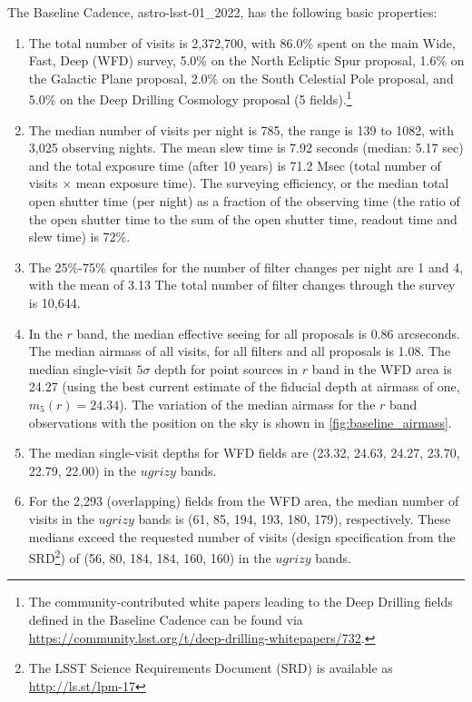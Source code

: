 \documentclass[DM,lsstdraft,authoryear,toc]{lsstdoc}
\begin{document}
The Baseline Cadence, astro-lsst-01\_2022, has the following basic properties:
\begin{enumerate}
\item The total number of visits is 2,372,700, with 86.0\% spent on
the main Wide, Fast, Deep (WFD) survey, 5.0\% on the
North Ecliptic Spur proposal, 1.6\% on the Galactic Plane proposal, 2.0\%
on the South Celestial Pole proposal, and 5.0\% on the Deep Drilling
Cosmology proposal (5 fields).\footnote{The community-contributed white papers leading to the
Deep Drilling fields defined in the Baseline Cadence can be found via
\url{https://community.lsst.org/t/deep-drilling-whitepapers/732}.}

\item The median number of visits per night is 785, the range is
139 to 1082, with 3,025 observing nights. The mean slew time is 7.92
seconds (median: 5.17 sec) and the total exposure time (after 10 years) is 71.2 Msec (total number of visits $\times$ mean exposure time).
The surveying efficiency, or the median total open shutter time (per night)
as a fraction of the observing time (the ratio of the open shutter time to
the sum of the open shutter time, readout time and slew time) is 72\%.

\item
The 25\%-75\% quartiles for the number of filter changes per night are 1
and 4, with the mean of 3.13 The total number of filter changes through the survey is 10,644.

\item In the $r$ band, the median effective seeing for all proposals is 0.86 arcseconds.
The median airmass of all visits, for all filters and all proposals is 1.08.
The median single-visit $5\sigma$ depth for point sources in $r$ band in the WFD area is 24.27 (using the best
current estimate of the fiducial depth at airmass of one, $m_5(r)=24.34$).
The variation of the median airmass for the $r$
band observations with the position on the sky is shown in
\autoref{fig:baseline_airmass}.

\item The median single-visit depths for WFD fields are (23.32, 24.63, 24.27,
23.70, 22.79, 22.00) in the $ugrizy$ bands.

\item For the 2,293 (overlapping) fields from the WFD area,
the median number of visits in the $ugrizy$ bands is (61, 85, 194, 193, 180,
179), respectively. These medians exceed the requested
number of visits (design specification from the SRD\footnote{The LSST
Science Requirements Document (SRD) is available as
\url{http://ls.st/lpm-17}}) of (56, 80, 184, 184, 160, 160) in the $ugrizy$
bands.


\end{enumerate}
\end{document}
